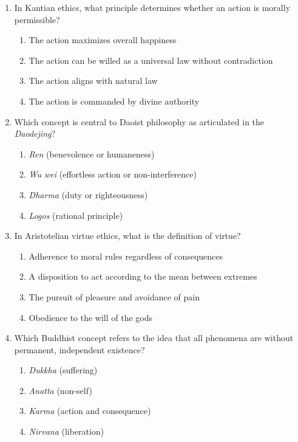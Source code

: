 \documentclass[11pt]{article}
\begin{document}
\begin{enumerate}[label=\textbf{\arabic*.}]

  \item In Kantian ethics, what principle determines whether an action is morally permissible?
  \begin{enumerate}[label=(\Alph*)]
    \item The action maximizes overall happiness
    \item The action can be willed as a universal law without contradiction
    \item The action aligns with natural law
    \item The action is commanded by divine authority
  \end{enumerate}

  \item Which concept is central to Daoist philosophy as articulated in the \textit{Daodejing}?
  \begin{enumerate}[label=(\Alph*)]
    \item \textit{Ren} (benevolence or humaneness)
    \item \textit{Wu wei} (effortless action or non-interference)
    \item \textit{Dharma} (duty or righteousness)
    \item \textit{Logos} (rational principle)
  \end{enumerate}

  \item In Aristotelian virtue ethics, what is the definition of virtue?
  \begin{enumerate}[label=(\Alph*)]
    \item Adherence to moral rules regardless of consequences
    \item A disposition to act according to the mean between extremes
    \item The pursuit of pleasure and avoidance of pain
    \item Obedience to the will of the gods
  \end{enumerate}

  \item Which Buddhist concept refers to the idea that all phenomena are without permanent, 
  independent existence?
  \begin{enumerate}[label=(\Alph*)]
    \item \textit{Dukkha} (suffering)
    \item \textit{Anatta} (non-self)
    \item \textit{Karma} (action and consequence)
    \item \textit{Nirvana} (liberation)
  \end{enumerate}


\end{enumerate}
\end{document}
